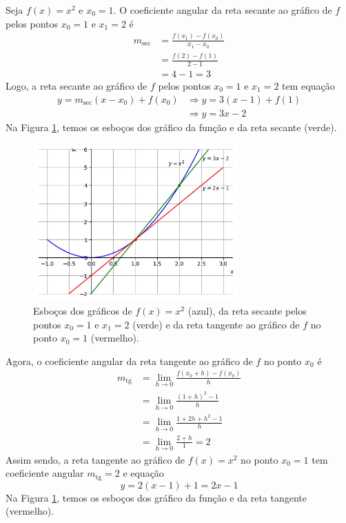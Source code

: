 \cleardoublepage\documentclass[../main.tex]{subfiles}
\begin{document}
\begin{ex}
  Seja $f(x)=x^2$ e $x_0 = 1$. O coeficiente angular da reta secante ao gráfico de $f$ pelos pontos $x_0=1$ e $x_1 = 2$ é
  \begin{align*}
    m_{\text{sec}} &= \frac{f(x_1)-f(x_0)}{x_1-x_0}\\
                   &= \frac{f(2) - f(1)}{2-1}\\
                   &= 4-1 = 3
  \end{align*}
  Logo, a reta secante ao gráfico de $f$ pelos pontos $x_0=1$ e $x_1=2$ tem equação
  \begin{align*}
    y = m_{\text{sec}}(x-x_0) + f(x_0) &\Rightarrow y = 3(x-1)+f(1)\\
                                       &\Rightarrow y = 3x - 2
  \end{align*}
 Na Figura \ref{fig:cap_deriv_ex_rt_x2}, temos os esboços dos gráfico da função e da reta secante (verde).
  
  \begin{figure}[H]
    \centering
    \includegraphics[width=0.7\textwidth]{fig_deriv/fig_cap_deriv_ex_rt_x2}
    \caption{Esboços dos gráficos de $f(x)=x^2$ (azul), da reta secante pelos pontos $x_0=1$ e $x_1=2$ (verde) e da reta tangente ao gráfico de $f$ no ponto $x_0 = 1$ (vermelho).}
    \label{fig:cap_deriv_ex_rt_x2}
  \end{figure}

  Agora, o coeficiente angular da reta tangente ao gráfico de $f$ no ponto $x_0$ é
  \begin{align*}
    m_{\text{tg}} &= \lim_{h\to 0} \frac{f(x_0+h)-f(x_0)}{h}\\
                  &= \lim_{h\to 0} \frac{(1+h)^2-1}{h}\\
                  &= \lim_{h\to 0} \frac{1+2h+h^2-1}{h}\\
                  &= \lim_{h\to 0} \frac{2+h}{1} = 2
  \end{align*}
  Assim sendo, a reta tangente ao gráfico de $f(x)=x^2$ no ponto $x_0=1$ tem coeficiente angular $m_{\text{tg}} = 2$ e equação
  \begin{equation*}
    y = 2(x-1)+1 = 2x-1
  \end{equation*}
  Na Figura \ref{fig:cap_deriv_ex_rt_x2}, temos os esboços dos gráfico da função e da reta tangente (vermelho).
  

\end{ex}
\end{document}
